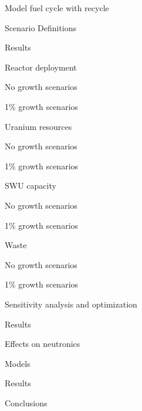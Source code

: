 \documentclass{report}
\begin{document}
\begin{outline}
\item Model fuel cycle with recycle 
\begin{outline}
    \item Scenario Definitions
    \item Results
    \begin{outline}
        \item Reactor deployment
        \begin{outline}
            \item No growth scenarios
            \item 1\% growth scenarios
        \end{outline}
        \item Uranium resources
        \begin{outline}
            \item No growth scenarios
            \item 1\% growth scenarios
        \end{outline}
        \item SWU capacity
        \begin{outline}
            \item No growth scenarios
            \item 1\% growth scenarios
        \end{outline}
        \item Waste
        \begin{outline}
            \item No growth scenarios
            \item 1\% growth scenarios
        \end{outline}
    \end{outline}
\end{outline}

\item Sensitivity analysis and optimization
\begin{outline}
    \item Results
\end{outline}

\item Effects on neutronics
\begin{outline}
    \item Models
    \item Results
\end{outline}

\item Conclusions
\end{outline}




\end{document}

